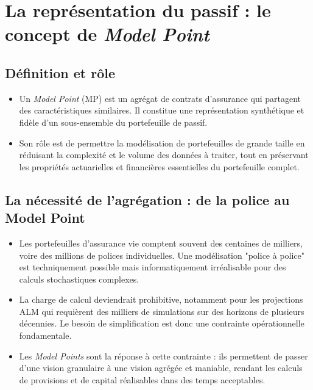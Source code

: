 \section{La représentation du passif : le concept de \textit{Model Point}}
\label{sec:mp}

\subsection{Définition et rôle}
\begin{itemize}
    \item Un \textit{Model Point} (MP) est un agrégat de contrats d'assurance qui partagent des caractéristiques similaires. Il constitue une représentation synthétique et fidèle d'un sous-ensemble du portefeuille de passif. \newline{}
    \item Son rôle est de permettre la modélisation de portefeuilles de grande taille en réduisant la complexité et le volume des données à traiter, tout en préservant les propriétés actuarielles et financières essentielles du portefeuille complet.
\end{itemize}

\subsection{La nécessité de l'agrégation : de la police au Model Point}
\begin{itemize}
    \item Les portefeuilles d'assurance vie comptent souvent des centaines de milliers, voire des millions de polices individuelles. Une modélisation "police à police" est techniquement possible mais informatiquement irréalisable pour des calculs stochastiques complexes. \newline{}
    \item La charge de calcul deviendrait prohibitive, notamment pour les projections ALM qui requièrent des milliers de simulations sur des horizons de plusieurs décennies. Le besoin de simplification est donc une contrainte opérationnelle fondamentale. \newline{}
    \item Les \textit{Model Points} sont la réponse à cette contrainte : ils permettent de passer d'une vision granulaire à une vision agrégée et maniable, rendant les calculs de provisions et de capital réalisables dans des temps acceptables.
\end{itemize}

